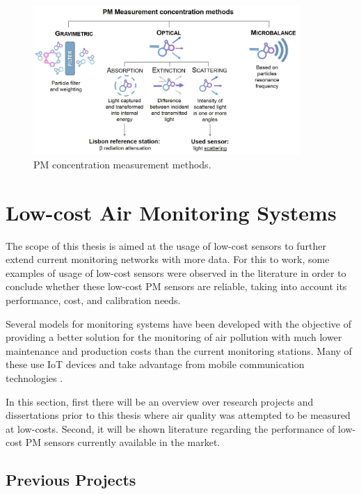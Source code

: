 \begin{figure}[ht]
\centering
\includegraphics[width=0.9\textwidth]{./Images/pm-measurement-methods.jpg}
\caption{PM concentration measurement methods.}
\label{fig:pm-measurement-methods}
\end{figure}

\section{Low-cost Air Monitoring Systems}

The scope of this thesis is aimed at the usage of low-cost sensors to further extend current monitoring networks with more data. For this to work, some examples of usage of low-cost sensors were observed in the literature in order to conclude whether these low-cost PM sensors are reliable, taking into account its performance, cost, and calibration needs.

Several models for monitoring systems have been developed with the objective of providing a better solution for the monitoring of air pollution with much lower maintenance and production costs than the current monitoring stations. Many of these use IoT devices and take advantage from mobile communication technologies \cite{Zheng2018}\cite{Wendt2019}\cite{Quelhas2011}. 

In this section, first there will be an overview over research projects and dissertations prior to this thesis where air quality was attempted to be measured at low-costs. Second, it will be shown literature regarding the performance of low-cost PM sensors currently available in the market.

\subsection{Previous Projects}

